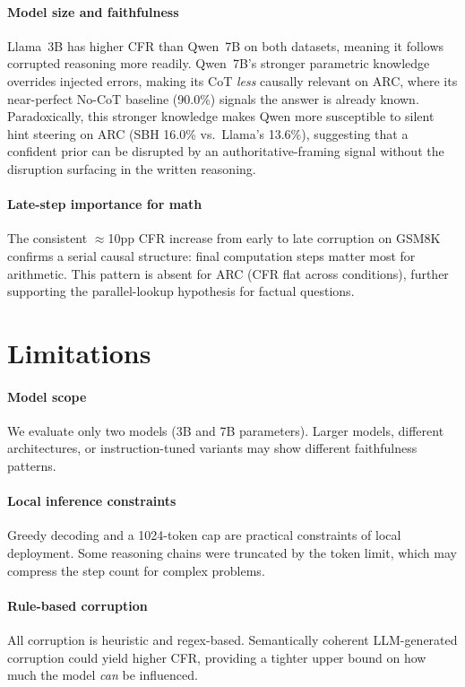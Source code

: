 \documentclass[11pt,twocolumn]{article}
\begin{document}
\paragraph{Model size and faithfulness}
Llama~3B has higher CFR than Qwen~7B on both datasets, meaning it follows
corrupted reasoning more readily. Qwen~7B's stronger parametric knowledge
overrides injected errors, making its CoT \emph{less} causally relevant on
ARC, where its near-perfect No-CoT baseline (90.0\%) signals the answer is
already known. Paradoxically, this stronger knowledge makes Qwen more
susceptible to silent hint steering on ARC (SBH 16.0\% vs.\ Llama's 13.6\%),
suggesting that a confident prior can be disrupted by an authoritative-framing
signal without the disruption surfacing in the written reasoning.

\paragraph{Late-step importance for math}
The consistent $\approx$10pp CFR increase from early to late corruption on
GSM8K confirms a serial causal structure: final computation steps matter most
for arithmetic. This pattern is absent for ARC (CFR flat across conditions),
further supporting the parallel-lookup hypothesis for factual questions.


\section{Limitations}

\paragraph{Model scope}
We evaluate only two models (3B and 7B parameters). Larger models, different
architectures, or instruction-tuned variants may show different faithfulness
patterns.

\paragraph{Local inference constraints}
Greedy decoding and a 1024-token cap are practical constraints of local
deployment. Some reasoning chains were truncated by the token limit, which
may compress the step count for complex problems.

\paragraph{Rule-based corruption}
All corruption is heuristic and regex-based. Semantically coherent
LLM-generated corruption could yield higher CFR, providing a tighter
upper bound on how much the model \emph{can} be influenced.
\end{document}
